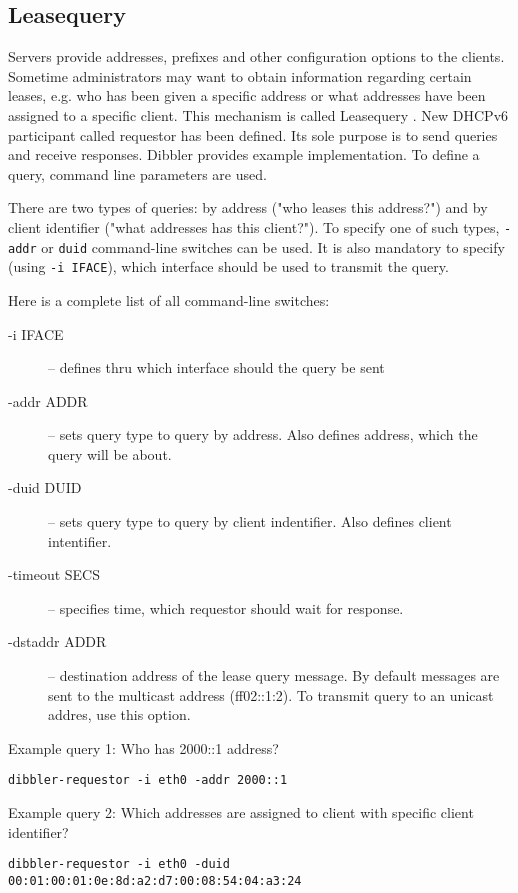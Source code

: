 \subsection{Leasequery}
\label{feature-leasequery}
Servers provide addresses, prefixes and other configuration options to
the clients. Sometime administrators may want to obtain information
regarding certain leases, e.g. who has been given a specific address
or what addresses have been assigned to a specific client. This
mechanism is called Leasequery \cite{rfc5007}. New DHCPv6 participant
called requestor has been defined. Its sole purpose is to send queries
and receive responses. Dibbler provides example implementation. To
define a query, command line parameters are used.

There are two types of queries: by address ("who leases this address?")
and by client identifier ("what addresses has this client?"). To specify
one of such types, \verb+-addr+ or \verb+duid+ command-line switches
can be used. It is also mandatory to specify (using \verb+-i IFACE+),
which interface should be used to transmit the query.

Here is a complete list of all command-line switches:

\begin{description}
\item[-i IFACE] -- defines thru which interface should the query be sent
\item[-addr ADDR] -- sets query type to query by address. Also defines
  address, which the query will be about.
\item[-duid DUID] -- sets query type to query by client
  indentifier. Also defines client intentifier.
\item[-timeout SECS] -- specifies time, which requestor should wait
  for response.
\item[-dstaddr ADDR] -- destination address of the lease query
  message. By default messages are sent to the multicast address
  (ff02::1:2). To transmit query to an unicast addres, use this option.
\end{description}

Example query 1: Who has 2000::1 address?

\begin{lstlisting}
dibbler-requestor -i eth0 -addr 2000::1
\end{lstlisting}

Example query 2: Which addresses are assigned to client with specific
client identifier?

\begin{lstlisting}
dibbler-requestor -i eth0 -duid 00:01:00:01:0e:8d:a2:d7:00:08:54:04:a3:24
\end{lstlisting}

